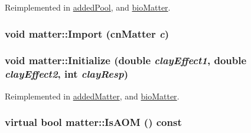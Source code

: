 Reimplemented in \hyperlink{classadded_pool_afec00b85b540b1d368dd51e1528e6aba}{addedPool}, and \hyperlink{classbio_matter_a35a43ac5963539bf7a22c28084ae4ff6}{bioMatter}.\hypertarget{classmatter_a284c87f3ce437b9e71f32ec14d9fab64}{
\subsubsection[{Import}]{\setlength{\rightskip}{0pt plus 5cm}void matter::Import ({\bf cnMatter} {\em c})}}
\label{classmatter_a284c87f3ce437b9e71f32ec14d9fab64}
\hypertarget{classmatter_adeae5b9c4239d6c02c19e04d346e6d10}{
\subsubsection[{Initialize}]{\setlength{\rightskip}{0pt plus 5cm}void matter::Initialize (double {\em clayEffect1}, \/  double {\em clayEffect2}, \/  int {\em clayResp})}}
\label{classmatter_adeae5b9c4239d6c02c19e04d346e6d10}


Reimplemented in \hyperlink{classadded_matter_a8b9b2332722afe8a6ad0a3b833d095dd}{addedMatter}, and \hyperlink{classbio_matter_a6d9aa5ce1a57e75f81c034f98bef428a}{bioMatter}.\hypertarget{classmatter_a838d402c6b41deb9d9c20eeabecd94a8}{
\subsubsection[{IsAOM}]{\setlength{\rightskip}{0pt plus 5cm}virtual bool matter::IsAOM () const}}
\label{classmatter_a838d402c6b41deb9d9c20eeabecd94a8}


